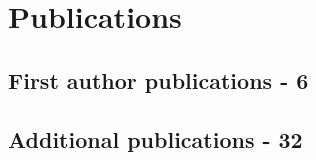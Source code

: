 \documentclass[11pt,a4paper,]{awesome-cv}
\begin{document}
\hypertarget{publications}{%
\section{Publications}\label{publications}}

\hypertarget{first-author-publications---6}{%
\subsection{First author publications -
6}\label{first-author-publications---6}}

\hypertarget{additional-publications---32}{%
\subsection{Additional publications -
32}\label{additional-publications---32}}
\end{document}
